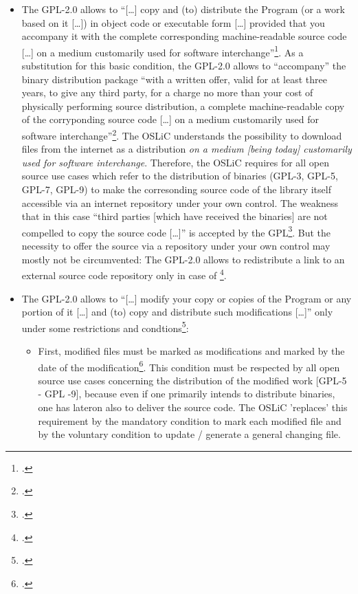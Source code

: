 \begin{itemize}
  \item The GPL-2.0 allows to \enquote{[\ldots] copy and (to) distribute the
  Program (or a work based on it [\ldots]) in object code or executable form
  [\ldots] provided that you accompany it with the complete corresponding
  machine-readable source code [\ldots] on a medium customarily used for
  software interchange}\footcite[cf.][\nopage wp.\ §3,
  §3a]{Gpl20OsiLicense1991a}. As a substitution for this basic condition, the
  GPL-2.0 allows to \enquote{accompany} the binary distribution package
  \enquote{with a written offer, valid for at least three years, to give any
  third party, for a charge no more than your cost of physically performing
  source distribution, a complete machine-readable copy of the corryponding
  source code [\ldots] on a medium customarily used for software
  interchange}\footcite[cf.][\nopage wp.\ §3b]{Gpl20OsiLicense1991a}. The OSLiC
  understands the possibility to download files from the internet as a
  distribution \emph{on a medium [being today] customarily used for software
  interchange}. Therefore, the OSLiC requires for all open source use cases
  which refer to the distribution of binaries (GPL-3, GPL-5, GPL-7, GPL-9) to
  make the corresonding source code of the library itself accessible via an
  internet repository under your own control. The weakness that in this case
  \enquote{third parties [which have received the binaries] are not compelled to
  copy the source code [\ldots]} is accepted by the GPL\footcite[cf.][\nopage
  wp.\ §3, at the end]{Gpl20OsiLicense1991a}. But the necessity to offer the
  source via a repository under your own control may mostly not be circumvented:
  The GPL-2.0 allows to redistribute a link to an external source code
  repository only in case of \footcite[cf.][\nopage wp.\ §3c]{Gpl20OsiLicense1991a}.
  
  \item The GPL-2.0 allows to \enquote{[\ldots] modify your copy or copies of
  the Program or any portion of it [\ldots] and (to) copy and distribute such
  modifications [\ldots]} only under some restrictions and
  condtions\footcite[cf.][\nopage wp.\ §2]{Gpl20OsiLicense1991a}:
  \begin{itemize}
    \item First, modified files must be marked as modifications and marked by
    the date of the modification\footcite[cf.][\nopage wp.\
    §2]{Gpl20OsiLicense1991a}. This condition must be respected by all open
    source use cases concerning the distribution of the modified work [GPL-5 -
    GPL -9], because even if one primarily intends to distribute binaries, one
    has lateron also to deliver the source code. The OSLiC 'replaces' this
    requirement by the mandatory condition to mark each modified file and by the
    voluntary condition to update / generate a general changing file.
    

\end{itemize}
\end{itemize}
